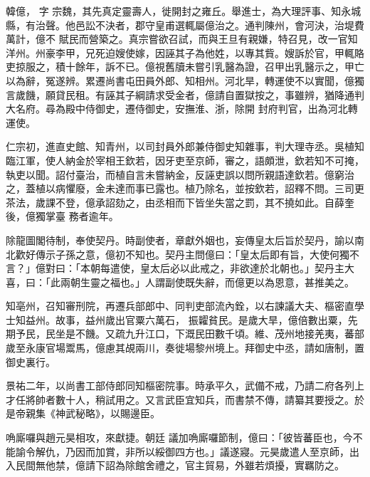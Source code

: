 
\begin{pinyinscope}

 韓億，
 字
 宗魏，其先真定靈壽人，徙開封之雍丘。舉進士，為大理評事、知永城縣，有治聲。他邑訟不決者，郡守皇甫選輒屬億治之。通判陳州，會河決，治堤費萬計，億不
 賦民而營築之。真宗嘗欲召試，而與王旦有親嫌，特召見，改一官知洋州。州豪李甲，兄死迫嫂使嫁，因誣其子為他姓，以專其貲。嫂訴於官，甲輒賂吏掠服之，積十餘年，訴不已。億視舊牘未嘗引乳醫為證，召甲出乳醫示之，甲亡以為辭，冤遂辨。累遷尚書屯田員外郎、知相州。河北旱，轉運使不以實聞，億獨言歲饑，願貸民租。有誣其子綱請求受金者，億請自置獄按之，事雖辨，猶降通判大名府。尋為殿中侍御史，遷侍御史，安撫淮、浙，除開
 封府判官，出為河北轉運使。



 仁宗初，進直史館、知青州，以司封員外郎兼侍御史知雜事，判大理寺丞。吳植知臨江軍，使人納金於宰相王欽若，因牙吏至京師，審之，語頗泄，欽若知不可掩，執吏以聞。詔付臺治，而植自言未嘗納金，反誣吏誤以問所親語達欽若。億窮治之，蓋植以病懼廢，金未達而事已露也。植乃除名，並按欽若，詔釋不問。三司更茶法，歲課不登，億承詔劾之，由丞相而下皆坐失當之罰，其不撓如此。自薛奎後，億獨掌臺
 務者逾年。



 除龍圖閣待制，奉使契丹。時副使者，章獻外姻也，妄傳皇太后旨於契丹，諭以南北歡好傳示子孫之意，億初不知也。契丹主問億曰：「皇太后即有旨，大使何獨不言？」億對曰：「本朝每遣使，皇太后必以此戒之，非欲達於北朝也。」契丹主大喜，曰：「此兩朝生靈之福也。」人謂副使既失辭，而億更以為恩意，甚推美之。



 知亳州，召知審刑院，再遷兵部郎中、同判吏部流內銓，以右諫議大夫、樞密直學士知益州。故事，益州歲出官粟六萬石，
 振糶貧民。是歲大旱，億倍數出粟，先期予民，民坐是不饑。又疏九升江口，下溉民田數千頃。維、茂州地接羌夷，蕃部歲至永康官場鬻馬，億慮其覘兩川，奏徙場黎州境上。拜御史中丞，請如唐制，置御史裏行。



 景祐二年，以尚書工部侍郎同知樞密院事。時承平久，武備不戒，乃請二府各列上才任將帥者數十人，稍試用之。又言武臣宜知兵，而書禁不傳，請纂其要授之。於是帝親集《神武秘略》，以賜邊臣。



 唃廝囉與趙元昊相攻，來獻捷。朝廷
 議加唃廝囉節制，億曰：「彼皆蕃臣也，今不能諭令解仇，乃因而加賞，非所以綏御四方也。」議遂寢。元昊歲遣人至京師，出入民間無他禁，億請下詔為除館舍禮之，官主貿易，外雖若煩擾，實羈防之。




\end{pinyinscope}

